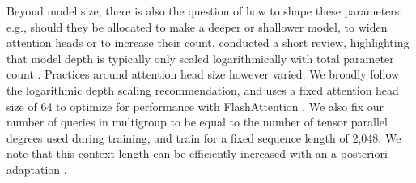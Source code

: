 \documentclass{article}
\begin{document}
Beyond model size, there is also the question of how to shape these parameters: e.g., should they be allocated to make a deeper or shallower model, to widen attention heads or to increase their count. \citet{what_lang_model} conducted a short review, highlighting that model depth is typically only scaled logarithmically with total parameter count \citep{levine2020limits}. Practices around attention head size however varied. We broadly follow the logarithmic depth scaling recommendation, and uses a fixed attention head size of 64 to optimize for performance with FlashAttention \citep{flash_attn}. We also fix our number of queries in multigroup to be equal to the number of tensor parallel degrees used during training, and train for a fixed sequence length of 2,048. We note that this context length can be efficiently increased with an a posteriori adaptation \citep{chen2023extending}.
\end{document}
